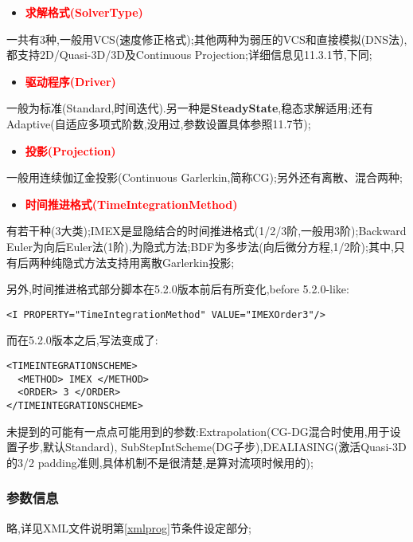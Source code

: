 \begin{itemize}
	\item{\textcolor{red}{\textbf{求解格式(SolverType)}}}
\end{itemize}
一共有3种,一般用VCS(速度修正格式);其他两种为弱压的VCS和直接模拟(DNS法),都支持2D/Quasi-3D/3D及Continuous Projection;详细信息见11.3.1节,下同;\par

\begin{itemize}
	\item{\textcolor{red}{\textbf{驱动程序(Driver)}}}
\end{itemize}
一般为标准(Standard,时间迭代).另一种是\textbf{SteadyState},稳态求解适用;还有Adaptive(自适应多项式阶数,没用过,参数设置具体参照11.7节);\par

\begin{itemize}
	\item{\textcolor{red}{\textbf{投影(Projection)}}}
\end{itemize}
一般用连续伽辽金投影(Continuous Garlerkin,简称CG);另外还有离散、混合两种;\par

\begin{itemize}
	\item{\textcolor{red}{\textbf{时间推进格式(TimeIntegrationMethod)}}}
\end{itemize}
有若干种(3大类);IMEX是显隐结合的时间推进格式(1/2/3阶,一般用3阶);Backward Euler为向后Euler法(1阶),为隐式方法;BDF为多步法(向后微分方程,1/2阶);其中,只有后两种纯隐式方法支持用离散Garlerkin投影;\par
另外,时间推进格式部分脚本在5.2.0版本前后有所变化,before 5.2.0-like:
\begin{lstlisting}[frame=single]
<I PROPERTY="TimeIntegrationMethod" VALUE="IMEXOrder3"/>
\end{lstlisting}
\par
而在5.2.0版本之后,写法变成了:\par
\begin{lstlisting}[frame=single]
<TIMEINTEGRATIONSCHEME>
  <METHOD> IMEX </METHOD>
  <ORDER> 3 </ORDER>
</TIMEINTEGRATIONSCHEME>
\end{lstlisting}
\par

未提到的可能有一点点可能用到的参数:Extrapolation(CG-DG混合时使用,用于设置子步,默认Standard), SubStepIntScheme(DG子步),DEALIASING(激活Quasi-3D的3/2 padding准则,具体机制不是很清楚,是算对流项时候用的);

\subsubsection{参数信息}
略,详见XML文件说明第\ref{xmlprog}节条件设定部分;

